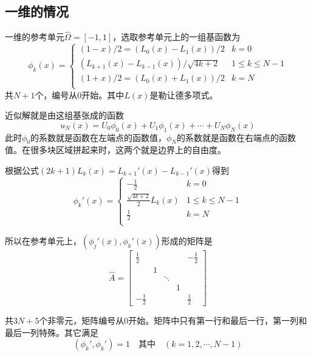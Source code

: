 \documentclass[UTF8,12pt]{article}
\begin{document}
\subsection{一维的情况}

一维的参考单元$\hat{\Omega} = [-1,1]$，选取参考单元上的一组基函数为
\begin{equation}
\phi_k(x) = \left\{ \begin{array}{ll}
(1-x)/2 = (L_0(x) - L_1(x))/2 & k = 0 \\
(L_{k+1}(x) - L_{k-1}(x)) / \sqrt{4k+2} & 1 \leq k \leq N-1 \\
(1+x)/2 = (L_0(x) + L_1(x))/2 & k = N \\
\end{array}  \right.
\end{equation}
共$N+1$个，编号从0开始。其中$L(x)$是勒让德多项式。

近似解就是由这组基张成的函数
$$ u_N(x) = U_0 \phi_0(x) + U_1 \phi_1(x) + \cdots + U_N \phi_N(x) $$
此时$\phi_0$的系数就是函数在左端点的函数值，$\phi_N$的系数就是函数在右端点的函数值。在很多块区域拼起来时，这两个就是边界上的自由度。

根据公式$(2k+1) L_k(x) = L_{k+1}'(x) - L_{k-1}'(x)$得到
\begin{equation}
\phi_k'(x) = \left\{ \begin{array}{ll}
-\frac{1}{2} & k = 0 \\
\frac{\sqrt{4k+2}}{2} L_{k}(x) & 1 \leq k \leq N-1 \\
\frac{1}{2} & k = N \\
\end{array} \right.
\end{equation}

所以在参考单元上，$(\phi_j'(x), \phi_k'(x))$形成的矩阵是
\begin{equation}
\hat{A} = \left[ \begin{matrix}
\frac12 &  &  &  & -\frac12 \\ 
& 1 &  &  &  \\ 
&  & \ddots &  &  \\ 
&  &  & 1 &  \\ 
-\frac12 &  &  &  & \frac12
\end{matrix}  \right]
\end{equation}

共$3N+5$个非零元，矩阵编号从0开始。矩阵中只有第一行和最后一行，第一列和最后一列特殊。其它满足
$$ (\phi_k', \phi_k') = 1 \quad \text{其中} \quad (k = 1, 2, \cdots, N-1) $$
\end{document}
